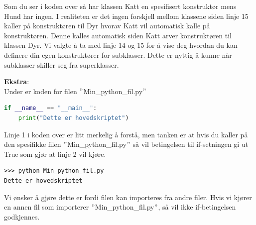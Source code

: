 Som du ser i koden over så har klassen Katt en spesifisert konstruktør mens Hund har ingen. I realiteten er det ingen forskjell mellom klassene siden linje 15 kaller på konstruktøren til Dyr hvorav Katt vil automatisk kalle på konstruktøren. Denne kalles automatisk siden Katt arver konstruktøren til klassen Dyr. Vi valgte å ta med linje 14 og 15 for å vise deg hvordan du kan definere din egen konstruktører for subklasser. Dette er nyttig å kunne når subklasser skiller seg fra superklasser.

\textbf{Ekstra}: \\
Under er koden for filen $"$Min\_python\_fil.py$"$
\begin{lstlisting}[language=python]
if __name__ == "__main__":
    print("Dette er hovedskriptet")
\end{lstlisting}

Linje 1 i koden over er litt merkelig å forstå, men tanken er at hvis du kaller på den spesifikke filen  $"$Min\_python\_fil.py$"$ så vil betingelsen til if-setningen gi ut True som gjør at linje 2 vil kjøre.

\begin{lstlisting}
>>> python Min_python_fil.py
Dette er hovedskriptet
\end{lstlisting}
 Vi ønsker å gjøre dette er fordi filen kan importeres fra andre filer. Hvis vi kjører en annen fil som importerer  $"$Min\_python\_fil.py$"$, så vil ikke if-betingelsen godkjennes.  

